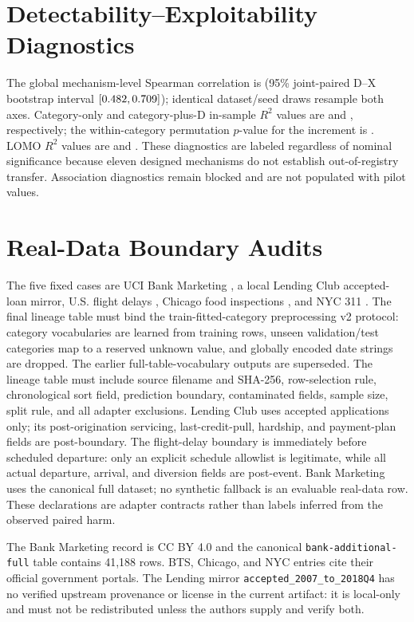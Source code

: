 \documentclass[letterpaper]{article}
\begin{document}
\section{Detectability--Exploitability Diagnostics}
\ifLBResultsReady
The global mechanism-level Spearman correlation is \LBGlobalSpearman{} (95\%
joint-paired D--X bootstrap interval
$[0.482,0.709]$); identical dataset/seed draws
resample both axes.  Category-only and
category-plus-D in-sample $R^2$ values are \LBCategoryRSquared{} and
\LBCategoryPlusDRSquared{}, respectively; the within-category permutation
$p$-value for the increment is \LBIncrementalPermutationP{}.  LOMO $R^2$
values are \LBCategoryLomoRSquared{} and
\LBCategoryPlusDLomoRSquared{}.  These diagnostics are labeled
\emph{\LBRelationStatus{}} regardless of nominal significance because eleven
designed mechanisms do not establish out-of-registry transfer.
\else
Association diagnostics remain blocked and are not populated with pilot
values.
\fi

\section{Real-Data Boundary Audits}
The five fixed cases are UCI Bank Marketing \citep{uciBankMarketing}, a local
Lending Club accepted-loan mirror, U.S. flight delays \citep{btsOnTime},
Chicago food inspections \citep{chicagoFoodInspections}, and NYC 311
\citep{nyc311}.  The final lineage table
must bind the train-fitted-category preprocessing v2 protocol: category
vocabularies are learned from training rows, unseen validation/test categories
map to a reserved unknown value, and globally encoded date strings are dropped.
The earlier full-table-vocabulary outputs are superseded.  The lineage table
must include source filename and SHA-256, row-selection rule, chronological
sort field, prediction boundary, contaminated fields, sample size, split rule,
and all adapter exclusions.  Lending Club uses accepted applications only;
its post-origination servicing, last-credit-pull, hardship, and payment-plan
fields are post-boundary.  The flight-delay boundary is immediately before
scheduled departure: only an explicit schedule allowlist is legitimate, while
all actual departure, arrival, and diversion fields are post-event.  Bank
Marketing uses the canonical full dataset; no synthetic fallback is an
evaluable real-data row.  These declarations are adapter contracts rather than
labels inferred from the observed paired harm.

The Bank Marketing record is CC BY 4.0 and the canonical
\texttt{bank-additional-full} table contains 41,188 rows.  BTS, Chicago, and
NYC entries cite their official government portals.  The Lending mirror
\texttt{accepted\_2007\_to\_2018Q4} has no verified upstream provenance or
license in the current artifact: it is local-only and must not be redistributed
unless the authors supply and verify both.
\end{document}
